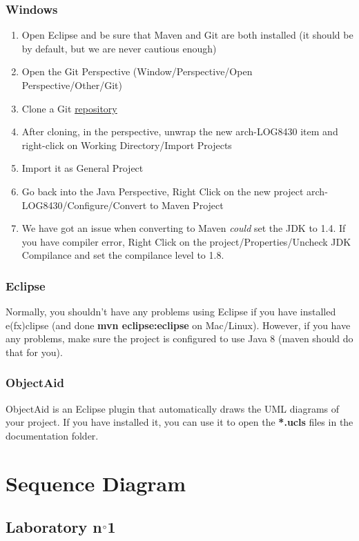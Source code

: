 \documentclass{report}
\begin{document}
\subsection{Windows}
\begin{enumerate}
\item Open Eclipse and be sure that Maven and Git are both installed (it should be by default, but we are never cautious enough)
\item Open the Git Perspective (Window/Perspective/Open Perspective/Other/Git)
\item Clone a Git \href{https://github.com/cnamal/arch-LOG8430}{repository}
\item After cloning, in the perspective, unwrap the new arch-LOG8430 item and right-click on Working Directory/Import Projects
\item Import it as General Project
\item Go back into the Java Perspective, Right Click on the new project arch-LOG8430/Configure/Convert to Maven Project 
\item We have got an issue when converting to Maven \emph{could} set the JDK to 1.4. If you have compiler error, Right Click on the project/Properties/Uncheck JDK Compilance and set the compilance level to 1.8.
\end{enumerate}


\subsection{Eclipse}
Normally, you shouldn't have any problems using Eclipse if you have installed e(fx)clipse (and done \textbf{mvn eclipse:eclipse} on Mac/Linux). However, if you have any problems, make sure the project is configured to use Java 8 (maven should do that for you).

\subsection{ObjectAid}
ObjectAid is an Eclipse plugin that automatically draws the UML diagrams of your project. If you have installed it, you can use it to open the \textbf{*.ucls} files in the documentation folder.
\chapter{Sequence Diagram}

\section{Laboratory n$\degree$1}
\end{document}
